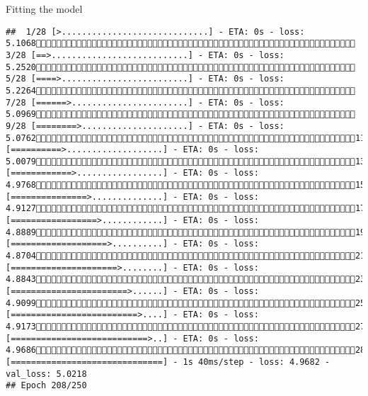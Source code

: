 \documentclass[
  ignorenonframetext,
]{beamer}
\begin{document}
\begin{frame}[fragile]{Fitting the model}
\begin{verbatim}
##  1/28 [>.............................] - ETA: 0s - loss: 5.1068 3/28 [==>...........................] - ETA: 0s - loss: 5.2520 5/28 [====>.........................] - ETA: 0s - loss: 5.2264 7/28 [======>.......................] - ETA: 0s - loss: 5.0969 9/28 [========>.....................] - ETA: 0s - loss: 5.076211/28 [==========>...................] - ETA: 0s - loss: 5.007913/28 [============>.................] - ETA: 0s - loss: 4.976815/28 [===============>..............] - ETA: 0s - loss: 4.912717/28 [=================>............] - ETA: 0s - loss: 4.888919/28 [===================>..........] - ETA: 0s - loss: 4.870421/28 [=====================>........] - ETA: 0s - loss: 4.884323/28 [=======================>......] - ETA: 0s - loss: 4.909925/28 [=========================>....] - ETA: 0s - loss: 4.917327/28 [===========================>..] - ETA: 0s - loss: 4.968628/28 [==============================] - 1s 40ms/step - loss: 4.9682 - val_loss: 5.0218
## Epoch 208/250

\end{verbatim}
\end{frame}
\end{document}
